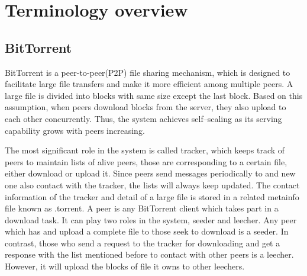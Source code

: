 \documentclass[conference]{IEEEtran}
\begin{document}
	
	
	
	\section{Terminology overview}
	\subsection{BitTorrent}
	
	BitTorrent is a peer-to-peer(P2P) file sharing mechanism, which is designed to facilitate large file transfers and make it more efficient among multiple peers. A large file is divided into blocks with same size except the last block. Based on this assumption, when peers download blocks from the server, they also upload to each other concurrently. Thus, the system achieves self–scaling as its serving capability grows with peers increasing. 
	
	The most significant role in the system is called tracker\cite{BitTorrent}, which keeps track of peers to maintain lists of alive peers, those are corresponding to a certain file, either download or upload it. Since peers send messages periodically to and new one also contact with the tracker, the lists will always keep updated. The contact information of the tracker and detail of a large file is stored in a related metainfo file known as .torrent. A peer is any BitTorrent client which takes part in a download task. It can play two roles in the system, seeder and leecher. Any peer which has and upload a complete file to those seek to download is a seeder. In contrast, those who send a request to the tracker for downloading and get a response with the list mentioned before to contact with other peers is a leecher. However, it will upload the blocks of file it owns to other leechers.
	
\end{document}
